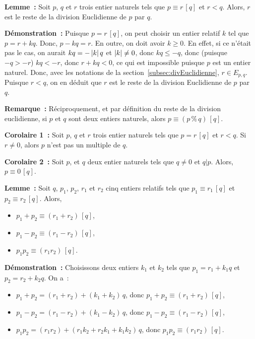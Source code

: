     \done

\medskip 

\noindent\textbf{Lemme :} Soit $p$, $q$ et $r$ trois entier naturels tels que $p \equiv r \, [q]$ et $r < q$.
    Alors, $r$ est le reste de la division Euclidienne de $p$ par $q$.

\medskip 
    
\noindent\textbf{Démonstration :}
    Puisque $p = r \, [q]$, on peut choisir un entier relatif $k$ tel que $p = r + k q$.
    Donc, $p - k q = r$.
    En outre, on doit avoir $k \geq 0$. 
    En effet, si ce n'était pas le cas, on aurait $k q = - \left\lvert k \right\rvert q$ et $\left\lvert k \right\rvert \neq 0$, donc $k q \leq -q$, donc (puisque $-q > -r$) $k q < -r$, donc $r + k q < 0$, ce qui est impossible puisque $p$ est un entier naturel.
    Donc, avec les notations de la section~\ref{subsec:divEuclidienne}, $r \in E_{p,q}$. 
    Puisque $r < q$, on en déduit que $r$ est le reste de la division Euclidienne de $p$ par $q$.

    \done

\medskip 

\noindent\textbf{Remarque :} Réciproquement, et par définition du reste de la division euclidienne, si $p$ et $q$ sont deux entiers naturels, alors $p \equiv (p \mathrel{\%} q) \, [q]$.

\medskip 

\noindent\textbf{Corolaire 1 :} Soit $p$, $q$ et $r$ trois entier naturels tels que $p = r \, [q]$ et $r < q$.
    Si $r \neq 0$, alors $p$ n'est pas un multiple de $q$.

\medskip 

\noindent\textbf{Corolaire 2 :} Soit $p$, et $q$ deux entier naturels tels que $q \neq 0$ et $q \vert p$.
    Alors, $p \equiv 0 \, [q]$.

\medskip 

\noindent\textbf{Lemme :} Soit $q$, $p_1$, $p_2$, $r_1$ et $r_2$ cinq entiers relatifs tels que $p_1 \equiv r_1 \, [q]$ et $p_2 \equiv r_2 \, [q]$.
Alors, 
\begin{itemize}[nosep]
    \item $p_1 + p_2 \equiv (r_1 + r_2) \, [q]$, 
    \item $p_1 - p_2 \equiv (r_1 - r_2) \, [q]$, 
    \item $p_1 p_2 \equiv (r_1 r_2) \, [q]$.
\end{itemize}

\medskip

\noindent\textbf{Démonstration :} Choisissons deux entiers $k_1$ et $k_2$ tels que $p_1 = r_1 + k_1 q$ et $p_2 = r_2 + k_2 q$. 
On a :
\begin{itemize}[nosep]
    \item $p_1 + p_2 = (r_1 + r_2) + (k_1 + k_2) \, q$, donc $p_1 + p_2 \equiv (r_1 + r_2) \, [q]$, 
    \item $p_1 - p_2 = (r_1 - r_2) + (k_1 - k_2) \, q$, donc $p_1 - p_2 \equiv (r_1 - r_2) \, [q]$, 
    \item $p_1 p_2 = (r_1 r_2) + (r_1 k_2 + r_2 k_1 + k_1 k_2) \, q$, donc $p_1 p_2 \equiv (r_1 r_2) \, [q]$.
\end{itemize}

